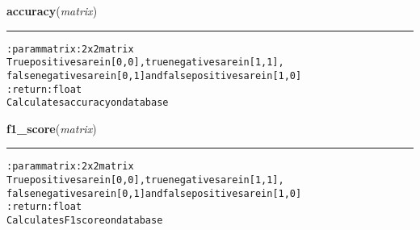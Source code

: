     \label{hal:ml:utils:matrix:accuracy}

    \vspace{0.5ex}

\hspace{.8\funcindent}\begin{boxedminipage}{\funcwidth}

    \raggedright \textbf{accuracy}(\textit{matrix})

    \vspace{-1.5ex}

    \rule{\textwidth}{0.5\fboxrule}
\setlength{\parskip}{2ex}
\begin{alltt}

:param matrix: 2 x 2 matrix
    True positives are in [0,0], true negatives are in [1,1],
    false negatives are in [0,1] and false positives are in [1,0]
:return: float
    Calculates accuracy on database
\end{alltt}

\setlength{\parskip}{1ex}
    \end{boxedminipage}

    \label{hal:ml:utils:matrix:f1_score}

    \vspace{0.5ex}

\hspace{.8\funcindent}\begin{boxedminipage}{\funcwidth}

    \raggedright \textbf{f1\_score}(\textit{matrix})

    \vspace{-1.5ex}

    \rule{\textwidth}{0.5\fboxrule}
\setlength{\parskip}{2ex}
\begin{alltt}

:param matrix: 2 x 2 matrix
    True positives are in [0,0], true negatives are in [1,1],
    false negatives are in [0,1] and false positives are in [1,0]
:return: float
    Calculates F1 score on database
\end{alltt}

\setlength{\parskip}{1ex}
    \end{boxedminipage}

